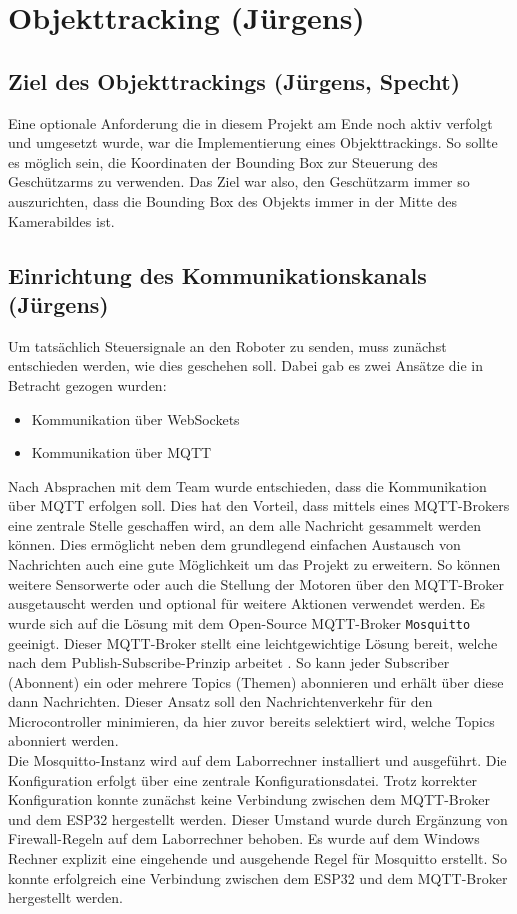 \chapter{Objekttracking (Jürgens)}
\section{Ziel des Objekttrackings (Jürgens, Specht)}
Eine optionale Anforderung die in diesem Projekt am Ende noch aktiv verfolgt und umgesetzt wurde, war die Implementierung eines Objekttrackings. So sollte es möglich sein, die Koordinaten der Bounding Box zur Steuerung des Geschützarms zu verwenden. Das Ziel war also, den Geschützarm immer so auszurichten, dass die Bounding Box des Objekts immer in der Mitte des Kamerabildes ist. 

\section{Einrichtung des Kommunikationskanals (Jürgens)}
Um tatsächlich Steuersignale an den Roboter zu senden, muss zunächst entschieden werden, wie dies geschehen soll. Dabei gab es zwei Ansätze die in Betracht gezogen wurden: 
\begin{itemize}
    \item Kommunikation über WebSockets
    \item Kommunikation über MQTT
\end{itemize}
Nach Absprachen mit dem Team wurde entschieden, dass die Kommunikation über MQTT erfolgen soll. Dies hat den Vorteil, dass mittels eines MQTT-Brokers eine zentrale Stelle geschaffen wird, an dem alle Nachricht gesammelt werden können. Dies ermöglicht neben dem grundlegend einfachen Austausch von Nachrichten auch eine gute Möglichkeit um das Projekt zu erweitern. So können weitere Sensorwerte oder auch die Stellung der Motoren über den MQTT-Broker ausgetauscht werden und optional für weitere Aktionen verwendet werden. Es wurde sich auf die Lösung mit dem Open-Source MQTT-Broker \texttt{Mosquitto} geeinigt. Dieser MQTT-Broker stellt eine leichtgewichtige Lösung bereit, welche nach dem Publish-Subscribe-Prinzip arbeitet \cite{Mosquitto}. So kann jeder Subscriber (Abonnent) ein oder mehrere Topics (Themen) abonnieren und erhält über diese dann Nachrichten. Dieser Ansatz soll den Nachrichtenverkehr für den Microcontroller minimieren, da hier zuvor bereits selektiert wird, welche Topics abonniert werden. 
\\ 
Die Mosquitto-Instanz wird auf dem Laborrechner installiert und ausgeführt. Die Konfiguration erfolgt über eine zentrale Konfigurationsdatei. Trotz korrekter Konfiguration konnte zunächst keine Verbindung zwischen dem MQTT-Broker und dem ESP32 hergestellt werden. Dieser Umstand wurde durch Ergänzung von Firewall-Regeln auf dem Laborrechner behoben. Es wurde auf dem Windows Rechner explizit eine eingehende und ausgehende Regel für Mosquitto erstellt. So konnte erfolgreich eine Verbindung zwischen dem ESP32 und dem MQTT-Broker hergestellt werden.

